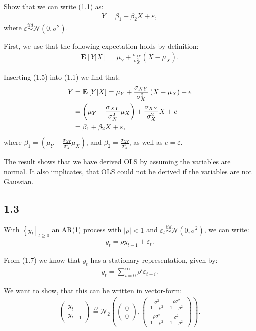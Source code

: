 \documentclass[11pt,a4paper,oneside]{article}
\newcommand{\lp}{\left(}
\newcommand{\rp}{\right)}
\newcommand{\rb}{\right]}
\newcommand{\lb}{\left[}
\newcommand{\lc}{\left\{}
\newcommand{\ee}{\mathbf{E}}
\newcommand{\nnn}{\mathcal{N}}
\newcommand{\iid}{\overset{iid}{\sim}}
\begin{document}
Show that we can write (1.1) as:
\begin{align}
    Y = \beta_1 + \beta_2 X + \varepsilon,
\end{align}
where $\varepsilon \iid \nnn\lp 0, \sigma^2\rp$.

First, we use that the following expectation holds by definition:
\begin{align}
    \ee\lb Y\vert X\rb = \mu_Y + \frac{\sigma_{XY}}{\sigma_X^2}\lp X - \mu_X\rp.
\end{align}

Inserting (1.5) into (1.1) we find that:
\begin{align}
    Y 
        &= \ee\lb Y\vert X\rb = \mu_Y + \frac{\sigma_{XY}}{\sigma_X^2}\lp X - \mu_X\rp + e \notag \\
        &= \lp \mu_Y - \frac{\sigma_{XY}}{\sigma_X^2} \mu_X\rp + \frac{\sigma_{XY}}{\sigma_X^2}X + e\notag\\
        &= \beta_1 + \beta_2 X + \varepsilon,
\end{align}
where $\beta_1 =\lp \mu_Y - \frac{\sigma_{XY}}{\sigma_X^2} \mu_X\rp$, and $\beta_2 = \frac{\sigma_{XY}}{\sigma_X^2}$, as well as $e = \varepsilon$.

The result shows that we have derived OLS by assuming the variables are normal. It also implicates, that OLS could not be derived if the variables are not Gaussian.

\subsection{1.3}
With $\lc y_t\rb_{t\geq 0}$ an AR(1) process with $\vert \rho\vert < 1$ and $\varepsilon_t \iid\nnn\lp 0, \sigma^2\rp$, we can write:
\begin{align}
    y_t = \rho y_{t-1} + \varepsilon_t.
\end{align}

From (1.7) we know that $y_t$ has a stationary representation, given by:
\begin{align}
    y_t = \sum_{i=0}^\infty \rho^i \varepsilon_{t-i}.
\end{align}

We want to show, that this can be written in vector-form:
\begin{align}
    \begin{pmatrix} y_t \\ y_{t-1}\end{pmatrix} \overset{D}{=} \nnn_2\lp
        \begin{pmatrix}0 \\ 0\end{pmatrix},
        \begin{pmatrix}
            \frac{\sigma^2}{1 - \rho^2} & \frac{\rho \sigma^2}{1 - \rho^2}\\
            \frac{\rho \sigma^2}{1 - \rho^2} & \frac{\sigma^2}{1 - \rho^2}
        \end{pmatrix}
        \rp.
\end{align}
\end{document}
